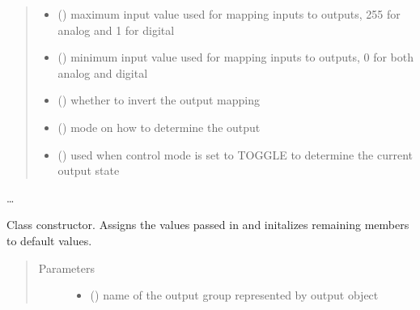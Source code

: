 \documentclass[letterpaper,10pt,english]{sphinxmanual}
\begin{document}
\begin{fulllineitems}
\begin{quote}
\begin{description}
\begin{itemize}
\item {} 
\sphinxAtStartPar
{}() \textendash{} maximum input value used for mapping 
inputs to outputs, 255 for analog and 1 for digital

\item {} 
\sphinxAtStartPar
{}() \textendash{} minimum input value used for mapping 
inputs to outputs, 0 for both analog and digital

\item {} 
\sphinxAtStartPar
{}(\sphinxstyleemphasis{{[}Boolean{]}}) \textendash{} whether to invert the output 
mapping

\item {} 
\sphinxAtStartPar
{}() \textendash{} mode on how to determine 
the output

\item {} 
\sphinxAtStartPar
{}() \textendash{} used when control mode 
is set to TOGGLE to determine the current output state

\end{itemize}

\end{description}\end{quote}

\sphinxAtStartPar
…

\sphinxAtStartPar
{}

\begin{fulllineitems}
\label{\detokenize{generic:AnalogOutputObject.AnalogOutputObject.__init__}}
\sphinxAtStartPar
Class constructor. Assigns the values passed in and initalizes remaining 
members to default values.
\begin{quote}\begin{description}
\item[{Parameters}] \leavevmode\begin{itemize}
\item {} 
\sphinxAtStartPar
{} () \textendash{} name of the output group represented by output object


\end{itemize}
\end{description}
\end{quote}
\end{fulllineitems}
\end{fulllineitems}
\end{document}
